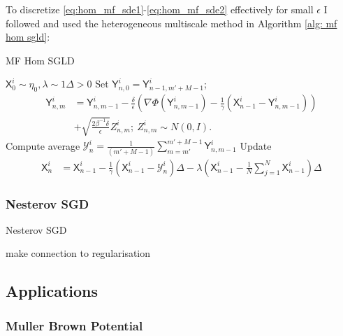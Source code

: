 \documentclass{article}
\begin{document}
To discretize \ref{eq:hom_mf_sde1}-\ref{eq:hom_mf_sde2} effectively
for small $\epsilon$ I followed \cite{kantas2019sharpflatshallowweakly} and used the heterogeneous multiscale method \cite{weinan2005analysis} in Algorithm \ref{alg: mf hom sgld}:

\begin{examplesblock}{MF Hom SGLD}\label{alg: mf hom sgld}
\begin{algorithmic}
	\Require $\mathsf{X}_{0}^{i}\sim\eta_{0}, \lambda \sim 1 \Delta >0$ 
\State Set $\mathsf{Y}_{n,0}^{i}=\mathsf{Y}_{n-1,m'+M-1}^{i}$;
\State \[\begin{array}{ll}
	\mathsf{Y}_{n,m}^{i} &=\mathsf{Y}_{n,m-1}^{i}-\frac{\delta}{\epsilon}\left(\nabla\Phi(\mathsf{Y}_{n,m-1}^{i})-\frac{1}{\gamma}(\mathsf{X}_{n-1}^{i}-\mathsf{Y}_{n,m-1}^{i})\right)\\&+\sqrt{\frac{2\beta^{-1}\delta}{\epsilon}}Z_{n,m}^{i};\:Z_{n,m}^{i}\sim N(0,I).
\end{array}\]
\EndFor
\State Compute average $\mathcal{Y}_{n}^{i}=\frac{1}{(m'+M-1)}\sum_{m=m'}^{m'+M-1}\mathsf{Y}_{n,m-1}^{i}$
\State Update
 \State  
\begin{align*}
\mathsf{X}_{n}^{i} & =\mathsf{X}_{n-1}^{i}-\frac{1}{\gamma}(\mathsf{X}_{n-1}^{i}-\mathcal{Y}_{n}^{i})\Delta-\lambda\left(\mathsf{X}_{n-1}^{i}-\frac{1}{N}\sum_{j=1}^{N}\mathsf{X}_{n-1}^{i}\right)\Delta
\end{align*}
\EndFor 
\end{algorithmic}
\end{examplesblock}

\subsubsection{Nesterov SGD}

\begin{examplesblock}{Nesterov SGD}\label{alg: nesterov sgd}
\begin{algorithmic}
    \State make connection to regularisation
\end{algorithmic}

\end{examplesblock}

\subsection{Applications}

\subsubsection{Muller Brown Potential}
\end{document}
